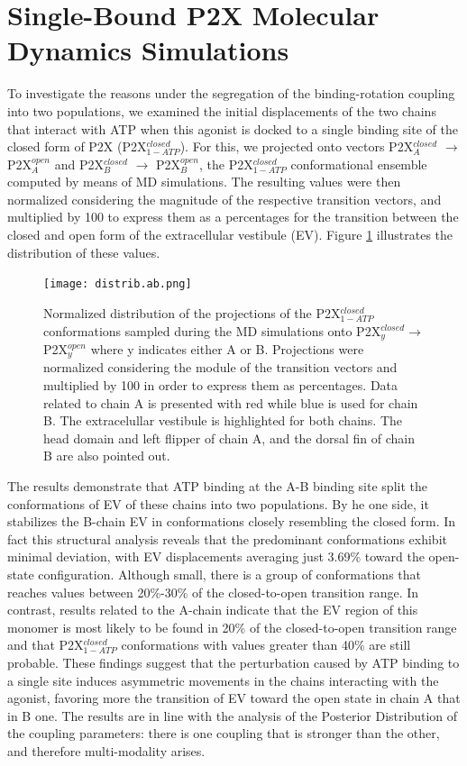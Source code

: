 \documentclass[pdflatex,sn-nature]{sn-jnl}%
\begin{document}
\section{Single-Bound P2X Molecular Dynamics Simulations}
To investigate the reasons under the segregation of the binding-rotation coupling into two populations, we examined the initial displacements of the two chains that interact with ATP when this agonist is docked to a single binding site of the closed form of P2X (P2X$^{closed}_{1-ATP}$). For this, we projected onto vectors P2X$^{closed}_A$ $\rightarrow$ P2X$^{open}_A$ and P2X$^{closed}_B$ $\rightarrow$ P2X$^{open}_B$, the  P2X$^{closed}_{1-ATP}$ conformational ensemble computed by means of MD simulations. 
The resulting values were then normalized considering the magnitude of the respective transition vectors, and multiplied by 100 to express them as a percentages for the transition between the closed and open form of the extracellular vestibule (EV). Figure \ref{fig:distri} illustrates the distribution of these values.

\begin{figure} [hbtp!]
  \begin{center}
    \texttt{[image: distrib.ab.png]}
    \caption{Normalized distribution of the projections of the P2X$^{closed}_{1-ATP}$ conformations sampled during the MD simulations onto P2X$^{closed}_y$$\rightarrow$P2X$^{open}_y$ where y indicates either A or B. Projections were normalized considering the module of the transition vectors and multiplied by 100 in order to express them as percentages.
    Data related to chain A is presented with red while blue is used for chain B. The extracelullar vestibule is highlighted for both chains. The head domain and left flipper of chain A, and the dorsal fin of chain B are also pointed out.}
 \label{fig:distri}
 \end{center}  
\end{figure}

The results demonstrate that ATP binding at the A-B binding site split the conformations of EV of these chains into two populations.
By he one side, it stabilizes the B-chain EV in conformations closely resembling the closed form. In fact this structural analysis reveals that the predominant conformations exhibit minimal deviation, with EV displacements averaging just 3.69\% toward the open-state configuration. Although small, there is a group of conformations that reaches values between 20\%-30\% of the closed-to-open transition range. 
In contrast, results related to the A-chain indicate that the EV region of this monomer is most likely to be found in 20\% of the closed-to-open transition range and that P2X$^{closed}_{1-ATP}$ conformations with values greater than 40\% are still probable. These findings suggest that the perturbation caused by ATP binding to a single site induces asymmetric movements in the chains interacting with the agonist, favoring more the transition of EV toward the open state in chain A that in B one. 
The results are in line with the analysis of the Posterior Distribution of the coupling parameters: there is one coupling that is stronger than the other, and therefore multi-modality arises.  
\end{document}
